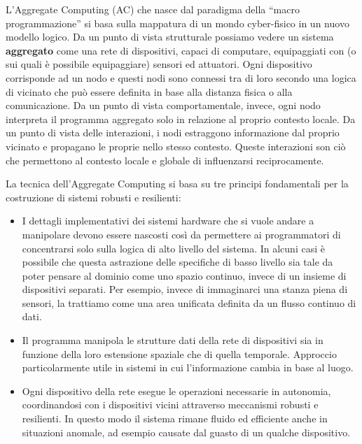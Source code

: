 \documentclass[12pt,a4paper,openright,twoside]{book}
\begin{document}
L'Aggregate Computing (AC) che nasce dal paradigma della ``macro programmazione'' si basa sulla mappatura di un mondo cyber-fisico in un nuovo modello logico. Da un punto di vista strutturale possiamo vedere un sistema \textbf{aggregato} come una rete di dispositivi, capaci di computare, equipaggiati con (o sui quali è possibile equipaggiare) sensori ed attuatori. Ogni dispositivo corrisponde ad un nodo e questi nodi sono connessi tra di loro secondo una logica di vicinato che può essere definita in base alla distanza fisica o alla comunicazione. Da un punto di vista comportamentale, invece, ogni nodo interpreta il programma aggregato solo in relazione al proprio contesto locale. Da un punto di vista delle interazioni, i nodi estraggono informazione dal proprio vicinato e propagano le proprie nello stesso contesto. Queste interazioni son ciò che permettono al contesto locale e globale di influenzarsi reciprocamente.

La tecnica dell'Aggregate Computing si basa su tre principi fondamentali per la costruzione di sistemi robusti e resilienti:

\begin{itemize}
    \item I dettagli implementativi dei sistemi hardware che si vuole andare a manipolare devono essere nascosti così da permettere ai programmatori di concentrarsi solo sulla logica di alto livello del sistema. In alcuni casi è possibile che questa astrazione delle specifiche di basso livello sia tale da poter pensare al dominio come uno spazio continuo, invece di un insieme di dispositivi separati. Per esempio, invece di immaginarci una stanza piena di sensori, la trattiamo come una area unificata definita da un flusso continuo di dati.
    \item Il programma manipola le strutture dati della rete di dispositivi sia in funzione della loro estensione spaziale che di quella temporale. Approccio particolarmente utile in sistemi in cui l'informazione cambia in base al luogo.
    \item Ogni dispositivo della rete esegue le operazioni necessarie in autonomia, coordinandosi con i dispositivi vicini attraverso meccanismi robusti e resilienti. In questo modo il sistema rimane fluido ed efficiente anche in situazioni anomale, ad esempio causate dal guasto di un qualche dispositivo.
\end{itemize}
\end{document}

